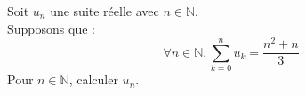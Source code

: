 \documentclass{article}
\date{\today}
\begin{document}
	Soit $u_n$ une suite réelle avec $n\in\mathbb{N}$. \\
	Supposons que :
	\[ \forall n\in\mathbb{N},\displaystyle \sum^n_{k=0}u_k=\frac{n^2+n}{3} \]
	Pour $n\in\mathbb{N}$, calculer $u_n$.
\end{document}
